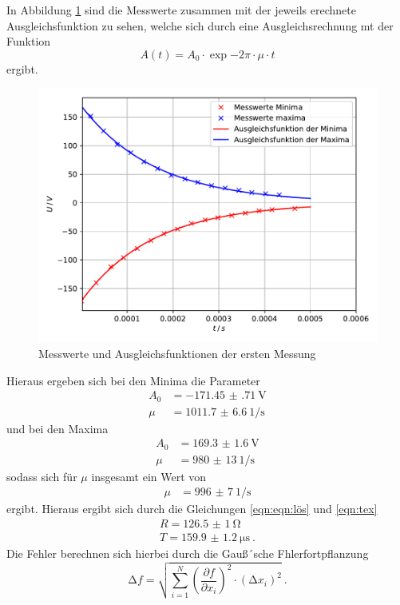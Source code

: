 \noindent In Abbildung \ref{fig:plot1} sind die Messwerte zusammen mit der jeweils erechnete Ausgleichsfunktion
zu sehen, welche sich durch eine Ausgleichsrechnung mt der Funktion
\begin{equation}
  A(t)= A_0 \cdot \exp{-2\pi \cdot \mu \cdot t}
\end{equation}
ergibt.
\begin{figure}[H]
  \centering
  \includegraphics{plot1.pdf}
  \caption{Messwerte und Ausgleichsfunktionen der ersten Messung}
  \label{fig:plot1}
\end{figure}

\noindent Hieraus ergeben sich bei den Minima die Parameter
\begin{align*}
  A_0 &= \SI{-171.45(71)}{\volt} \\
  \mu&= \SI{1011.7(66)}{1\per\second}
\end{align*}
und bei den Maxima
\begin{align*}
  A_0 &= \SI{169.3(16)}{\volt} \\
  \mu&= \SI{980(13)}{1\per\second}
\end{align*}
sodass sich für $ \mu $ insgesamt ein Wert von
\begin{align*}
  \mu &= \SI{996(7)}{1\per\second}
\end{align*}
ergibt.
Hieraus ergibt sich durch die Gleichungen \ref{eqn:eqn:lös} und \ref{eqn:tex}
\begin{align*}
  R= \SI{126.5(10)}{\ohm} \\
  T= \SI{159.9(12)}{\micro\second} \: .
\end{align*}
Die Fehler berechnen sich hierbei durch die Gauß´sche Fhlerfortpflanzung
\begin{equation}
  \increment f = \sqrt{ \sum_{i=1}^N \left( \frac{\partial f}{\partial x_i}\right)^2
  \cdot (\increment x_i)^2  } \: .
  \label{eqn:gaus}
\end{equation}

